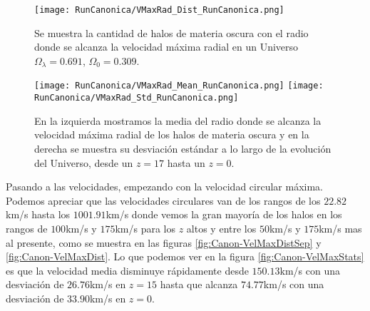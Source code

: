 \begin{figure}[H]
    \centering
    \texttt{[image: RunCanonica/VMaxRad\_Dist\_RunCanonica.png]}
    \caption[Distribución del radio donde se alcanza la velocidad máxima radial]{\footnotesize Se muestra la cantidad de halos de materia oscura con el radio donde se alcanza la velocidad máxima radial en un Universo $\Omega_\lambda = 0.691 $, $\Omega_0 = 0.309$.}
    \label{fig:Canon-VMaxRadDist}
\end{figure}

\begin{figure}[H]
    \centering
    \texttt{[image: RunCanonica/VMaxRad\_Mean\_RunCanonica.png]}
    \texttt{[image: RunCanonica/VMaxRad\_Std\_RunCanonica.png]}
    \caption[Media y desviación estándar del Radio donde se alcanza la velocidad máxima radial]{\footnotesize En la izquierda mostramos la media del radio donde se alcanza la velocidad máxima radial de los halos de materia oscura y en la derecha se muestra su desviación estándar a lo largo de la evolución del Universo, desde un $z=17$ hasta un $z=0$.}
    \label{fig:Canon-VMaxRadStats}
\end{figure}

Pasando a las velocidades, empezando con la velocidad circular máxima. Podemos apreciar que las velocidades circulares van de los rangos de los $22.82$km/s hasta los $1001.91$km/s donde vemos la gran mayoría de los halos en los rangos de $100$km/s y $175$km/s para los $z$ altos y entre los $50$km/s y $175$km/s mas al presente, como se muestra en las figuras \ref{fig:Canon-VelMaxDistSep} y \ref{fig:Canon-VelMaxDist}. Lo que podemos ver en la figura \ref{fig:Canon-VelMaxStats} es que la velocidad  media disminuye rápidamente desde $150.13$km/s con una desviación de $26.76$km/s en $z=15$ hasta que alcanza $74.77$km/s con una desviación de $33.90$km/s en $z=0$.


